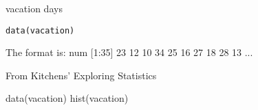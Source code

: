 \begin{Description}\relax
vacation days
\end{Description}
\begin{Usage}
\begin{verbatim}data(vacation)\end{verbatim}
\end{Usage}
\begin{Format}\relax
The format is:
num [1:35] 23 12 10 34 25 16 27 18 28 13 ...
\end{Format}
\begin{Source}\relax
From Kitchens' Exploring Statistics
\end{Source}
\begin{Examples}
\begin{ExampleCode}
data(vacation)
hist(vacation)
\end{ExampleCode}
\end{Examples}

